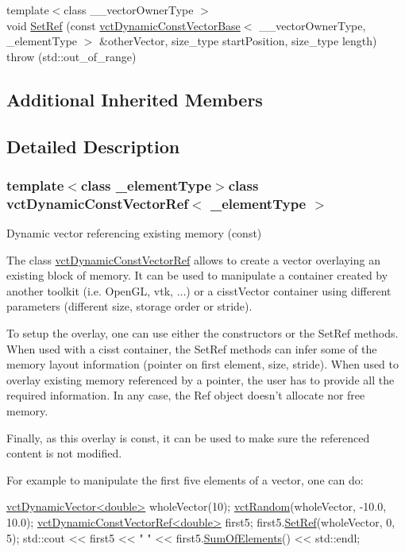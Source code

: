 \begin{DoxyCompactItemize}
\item 
{\footnotesize template$<$class \-\_\-\-\_\-vector\-Owner\-Type $>$ }\\void \hyperlink{classvct_dynamic_const_vector_ref_a5e6cc77f6629acd36a60ea3d97a1c67b}{Set\-Ref} (const \hyperlink{classvct_dynamic_const_vector_base}{vct\-Dynamic\-Const\-Vector\-Base}$<$ \-\_\-\-\_\-vector\-Owner\-Type, \-\_\-element\-Type $>$ \&other\-Vector, size\-\_\-type start\-Position, size\-\_\-type length)  throw (std\-::out\-\_\-of\-\_\-range)
\end{DoxyCompactItemize}
\subsection*{Additional Inherited Members}


\subsection{Detailed Description}
\subsubsection*{template$<$class \-\_\-element\-Type$>$class vct\-Dynamic\-Const\-Vector\-Ref$<$ \-\_\-element\-Type $>$}

Dynamic vector referencing existing memory (const) 

The class \hyperlink{classvct_dynamic_const_vector_ref}{vct\-Dynamic\-Const\-Vector\-Ref} allows to create a vector overlaying an existing block of memory. It can be used to manipulate a container created by another toolkit (i.\-e. Open\-G\-L, vtk, ...) or a cisst\-Vector container using different parameters (different size, storage order or stride).

To setup the overlay, one can use either the constructors or the Set\-Ref methods. When used with a cisst container, the Set\-Ref methods can infer some of the memory layout information (pointer on first element, size, stride). When used to overlay existing memory referenced by a pointer, the user has to provide all the required information. In any case, the Ref object doesn't allocate nor free memory.

Finally, as this overlay is const, it can be used to make sure the referenced content is not modified.

For example to manipulate the first five elements of a vector, one can do\-: 
\begin{DoxyCode}
\hyperlink{classvct_dynamic_vector}{vctDynamicVector<double>} wholeVector(10);
\hyperlink{group__cisst_vector_ga0d25660a2dc6ef9c093f6f6b2804d2d0}{vctRandom}(wholeVector, -10.0, 10.0);
\hyperlink{classvct_dynamic_const_vector_ref}{vctDynamicConstVectorRef<double>} first5;
first5.\hyperlink{classvct_dynamic_const_vector_ref_a25ea281066863d915ea0bd65092d94b5}{SetRef}(wholeVector, 0, 5);
std::cout << first5 << \textcolor{stringliteral}{" "} << first5.\hyperlink{classvct_dynamic_const_vector_base_a8a06cb87f0416634404a756b08884d65}{SumOfElements}() << std::endl;
\end{DoxyCode}


